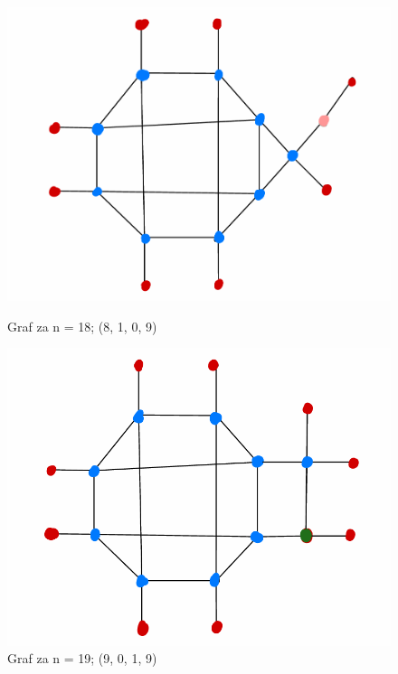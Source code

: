 \documentclass{article}
\begin{document}
\begin{figure}[H]
    \vspace{0.5cm} %

    \begin{minipage}{0.48\textwidth}
        \centering
        \includegraphics[width=\textwidth]{grafza18.png}
        \caption*{Graf za n = 18; (8, 1, 0, 9)}
    \end{minipage}
    \hfill
    \begin{minipage}{0.48\textwidth}
        \centering
        \includegraphics[width=\textwidth]{grafza19.png}
        \caption*{Graf za n = 19; (9, 0, 1, 9)}
    \end{minipage}
    
\end{figure}
\end{document}
